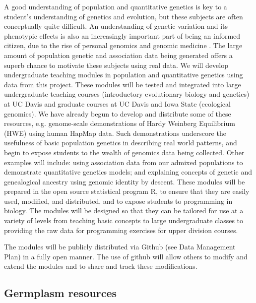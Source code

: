 A good understanding of population and quantitative genetics is key to a student’s understanding of genetics and evolution, but these subjects are often conceptually quite difficult. An understanding of genetic variation and its phenotypic effects is also an increasingly important part of being an informed citizen, due to the rise of personal genomics and genomic medicine \citep[e.g.][]{redfield2012}. The large amount of population genetic and association data being generated offers a superb chance to motivate these subjects using real data. 
We will develop undergraduate teaching modules in population and quantitative genetics using data from this project. These modules will be tested and integrated into large undergraduate teaching courses (introductory evolutionary biology and genetics) at UC Davis and graduate courses at UC Davis and Iowa State (ecological genomics). We have already begun to develop and distribute some of these resources, e.g. genome-scale demonstrations of Hardy Weinberg Equilibrium (HWE) using  human HapMap data. Such demonstrations underscore the usefulness of basic population genetics in describing real world patterns, and begin to expose students to the wealth of genomics data being collected. 
Other examples will include: using association data from our admixed populations to demonstrate quantitative genetics models; and explaining concepts of genetic and genealogical ancestry using genomic identity by descent.  These modules will be prepared in the open source statistical program R, to ensure that they are easily used, modified, and distributed, and to expose students to programming in biology. The modules will be designed so that they can be tailored for use at a variety of levels from teaching basic concepts to large undergraduate classes to providing the raw data for programming exercises for upper division courses.

The modules will be publicly distributed via Github (see Data Management Plan) in a fully open manner. The use of github will allow others to modify and extend the modules and to share and track these modifications. 

\subsection*{Germplasm resources} %

